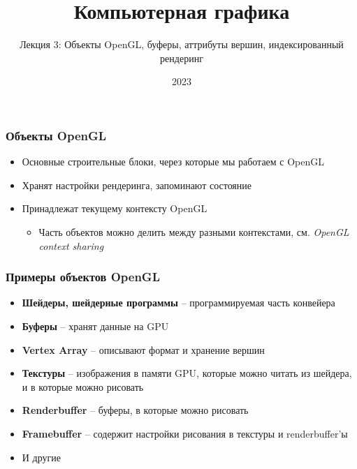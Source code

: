 \documentclass[10pt]{beamer}
\title{Компьютерная графика}
\subtitle{Лекция 3: Объекты OpenGL, буферы, аттрибуты вершин, индексированный рендеринг}
\date{2023}
\begin{document}
\frame{\titlepage}

\begin{frame}[fragile]
\frametitle{Объекты OpenGL}
\begin{itemize}
\item Основные строительные блоки, через которые мы работаем с OpenGL
\pause
\item Хранят настройки рендеринга, запоминают состояние
\pause
\item Принадлежат текущему контексту OpenGL
\pause
\begin{itemize}
\item Часть объектов можно делить между разными контекстами, см. \textit{OpenGL context sharing}
\end{itemize}
\end{itemize}
\end{frame}

\begin{frame}[fragile]
\frametitle{Примеры объектов OpenGL}
\begin{itemize}
\item \textbf{Шейдеры, шейдерные программы} -- программируемая часть конвейера
\pause
\item \textbf{Буферы} -- хранят данные на GPU
\pause
\item \textbf{Vertex Array} -- описывают формат и хранение вершин
\pause
\item \textbf{Текстуры} -- изображения в памяти GPU, которые можно читать из шейдера, и в которые можно рисовать
\pause
\item \textbf{Renderbuffer} -- буферы, в которые можно рисовать
\pause
\item \textbf{Framebuffer} -- содержит настройки рисования в текстуры и renderbuffer'ы
\pause
\item И другие
\end{itemize}
\end{frame}
\end{document}
